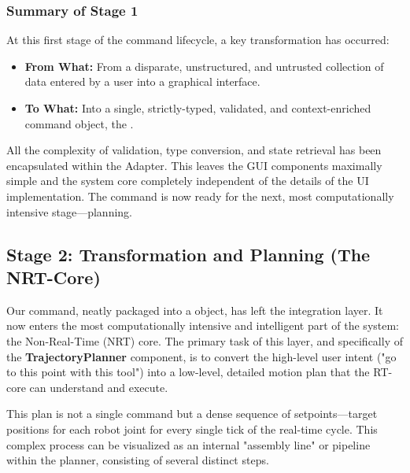 \subsubsection{Summary of Stage 1}
\label{subsubsec:stage1_summary}

At this first stage of the command lifecycle, a key transformation has occurred:
\begin{itemize}
    \item \textbf{From What:} From a disparate, unstructured, and untrusted collection of data entered by a user into a graphical interface.
    \item \textbf{To What:} Into a single, strictly-typed, validated, and context-enriched command object, the .
\end{itemize}

All the complexity of validation, type conversion, and state retrieval has been encapsulated within the Adapter. This leaves the GUI components maximally simple and the system core completely independent of the details of the UI implementation. The command is now ready for the next, most computationally intensive stage—planning.



\subsection{Stage 2: Transformation and Planning (The NRT-Core)}
\label{subsec:stage2_planning}

Our command, neatly packaged into a  object, has left the integration layer. It now enters the most computationally intensive and intelligent part of the system: the Non-Real-Time (NRT) core. The primary task of this layer, and specifically of the \textbf{TrajectoryPlanner} component, is to convert the high-level user intent ("go to this point with this tool") into a low-level, detailed motion plan that the RT-core can understand and execute.

This plan is not a single command but a dense sequence of setpoints—target positions for each robot joint for every single tick of the real-time cycle. This complex process can be visualized as an internal "assembly line" or pipeline within the planner, consisting of several distinct steps.

